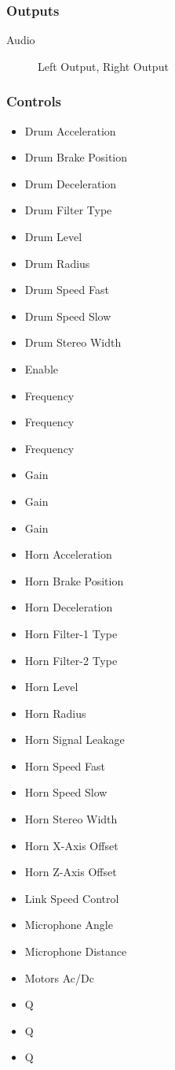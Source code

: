 \subsubsection{Outputs}
\begin{description}
\item [Audio] Left Output, Right Output
\end{description}

\subsubsection{Controls}
\begin{itemize}
\item Drum Acceleration
\item Drum Brake Position
\item Drum Deceleration
\item Drum Filter Type
\item Drum Level
\item Drum Radius
\item Drum Speed Fast
\item Drum Speed Slow
\item Drum Stereo Width
\item Enable
\item Frequency
\item Frequency
\item Frequency
\item Gain
\item Gain
\item Gain
\item Horn Acceleration
\item Horn Brake Position
\item Horn Deceleration
\item Horn Filter-1 Type
\item Horn Filter-2 Type
\item Horn Level
\item Horn Radius
\item Horn Signal Leakage
\item Horn Speed Fast
\item Horn Speed Slow
\item Horn Stereo Width
\item Horn X-Axis Offset
\item Horn Z-Axis Offset
\item Link Speed Control
\item Microphone Angle
\item Microphone Distance
\item Motors Ac/Dc
\item Q
\item Q
\item Q
\end{itemize}

